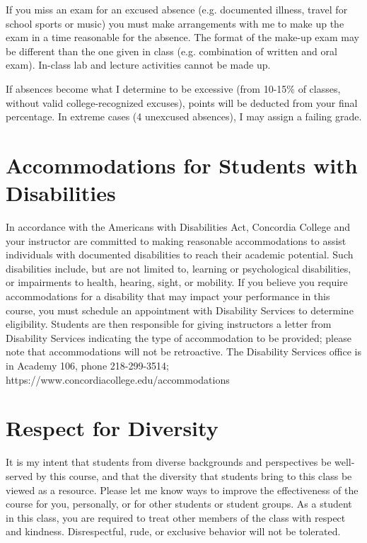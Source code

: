 \documentclass{tufte-handout}
\begin{document}
\begin{fullwidth}
If you miss an exam for an excused absence (e.g. documented illness, travel for school sports or music) you must make arrangements with me to make up the exam in a time reasonable for the absence. The format of the make-up exam may be different than the one given in class (e.g. combination of written and oral exam). In-class lab and lecture activities cannot be made up.

If absences become what I determine to be excessive (from 10-15\% of classes, without valid college-recognized excuses), points will be deducted from your final percentage. In extreme cases (4 unexcused absences), I may assign a failing grade. 

\section{Accommodations for Students with Disabilities}

In accordance with the Americans with Disabilities Act, Concordia College and your instructor are committed to making reasonable accommodations to assist individuals with documented disabilities to reach their academic potential. Such disabilities include, but are not limited to, learning or psychological disabilities, or impairments to health, hearing, sight, or mobility. If you believe you require accommodations for a disability that may impact your performance in this course, you must schedule an appointment with Disability Services to determine eligibility. Students are then responsible for giving instructors a letter from Disability Services indicating the type of accommodation to be provided; please note that accommodations will not be retroactive. The Disability Services office is in Academy 106, phone 218-299-3514; https://www.concordiacollege.edu/accommodations 

\section{Respect for Diversity}

It is my intent that students from diverse backgrounds and perspectives be well-served by this course, and that the diversity that students bring to this class be viewed as a resource. Please let me know ways to improve the effectiveness of the course for you, personally, or for other students or student groups. As a student in this class, you are required to treat other members of the class with respect and kindness. Disrespectful, rude, or exclusive behavior will not be tolerated.

\end{fullwidth}
\end{document}
